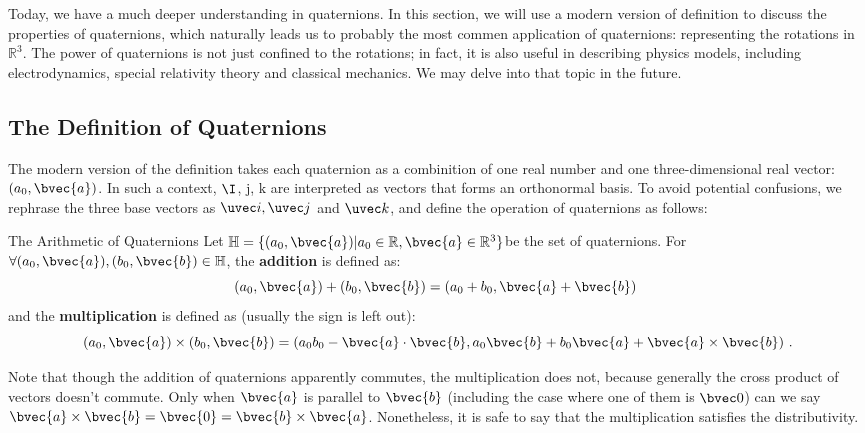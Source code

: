Today, we have a much deeper understanding in quaternions. In this section, we will use a modern version of definition to discuss the properties of quaternions, which naturally leads us to probably the most commen application of quaternions: representing the rotations in $\mathbb{R}^3$. The power of quaternions is not just confined to the rotations; in fact, it is also useful in describing physics models, including electrodynamics, special relativity theory and classical mechanics. We may delve into that topic in the future. 

\subsection{The Definition of Quaternions}

The modern version of the definition takes each quaternion as a combinition of one real number and one three-dimensional real vector: $(a_0, \bvec{a})$. In such a context, $\I$, $\mathrm{j}$, $\mathrm{k}$ are interpreted as vectors that forms an orthonormal basis. To avoid potential confusions, we rephrase the three base vectors as $\uvec i, \uvec j$ and $\uvec k$, and define the operation of quaternions as follows: 



\begin{definition}{The Arithmetic of Quaternions}
Let $\mathbb{H}=\{(a_0, \bvec{a})|a_0\in\mathbb{R}, \bvec{a}\in\mathbb{R}^3\}$be the set of quaternions. For $\forall(a_0, \bvec{a}), (b_0, \bvec{b})\in\mathbb{H}$, the \textbf{addition} is defined as:
\begin{equation}
(a_0, \bvec{a})+ (b_0, \bvec{b})=(a_0+b_0, \bvec{a}+\bvec{b})~
\end{equation}
and the \textbf{multiplication} is defined as (usually the sign is left out):
\begin{equation}\label{eq_QuaRot_1}
(a_0, \bvec{a})\times (b_0, \bvec{b})=(a_0b_0-\bvec{a}\cdot\bvec{b}, a_0\bvec{b}+b_0\bvec{a}+\bvec{a}\times\bvec{b})~.
\end{equation}
\end{definition}


Note that though the addition of quaternions apparently commutes, the multiplication does not, because generally the cross product of vectors doesn't commute. Only when $\bvec{a}$ is parallel to $\bvec{b}$ (including the case where one of them is $\bvec 0$) can we say $\bvec{a}\times\bvec{b}= \bvec{0} =\bvec{b}\times\bvec{a}$. Nonetheless, it is safe to say that the multiplication satisfies the distributivity. 




